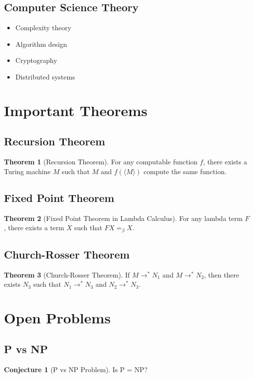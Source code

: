 \documentclass[11pt]{article}
\theoremstyle{definition}
\newtheorem{theorem}{Theorem}[section]
\newtheorem{conjecture}{Conjecture}[section]
\begin{document}
\subsection{Computer Science Theory}
\begin{itemize}
    \item Complexity theory
    \item Algorithm design
    \item Cryptography
    \item Distributed systems
\end{itemize}

\section{Important Theorems}

\subsection{Recursion Theorem}
\begin{theorem}[Recursion Theorem]
For any computable function $f$, there exists a Turing machine $M$ such that $M$ and $f(\langle M \rangle)$ compute the same function.
\end{theorem}

\subsection{Fixed Point Theorem}
\begin{theorem}[Fixed Point Theorem in Lambda Calculus]
For any lambda term $F$, there exists a term $X$ such that $F X =_\beta X$.
\end{theorem}

\subsection{Church-Rosser Theorem}
\begin{theorem}[Church-Rosser Theorem]
If $M \to^* N_1$ and $M \to^* N_2$, then there exists $N_3$ such that $N_1 \to^* N_3$ and $N_2 \to^* N_3$.
\end{theorem}

\section{Open Problems}

\subsection{P vs NP}
\begin{conjecture}[P vs NP Problem]
Is P = NP?
\end{conjecture}
\end{document}
